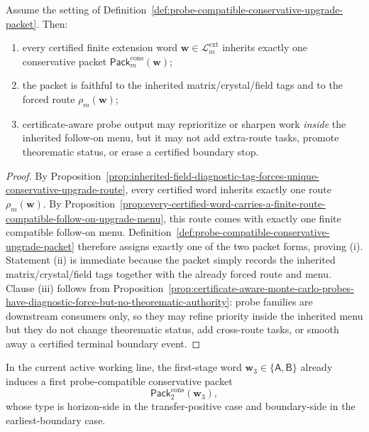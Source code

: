 \begin{proposition}
\label{prop:every-certified-word-inherits-exactly-one-probe-compatible-conservative-upgrade-packet}
Assume the setting of Definition~\ref{def:probe-compatible-conservative-upgrade-packet}. Then:
\begin{enumerate}[label=(\roman*)]
  \item every certified finite extension word \(\mathbf w\in\mathcal L^{\mathrm{ext}}_{m}\) inherits exactly one conservative packet \(\mathsf{Pack}^{\mathrm{cons}}_{m}(\mathbf w)\);
  \item the packet is faithful to the inherited matrix/crystal/field tags and to the forced route \(\rho_m(\mathbf w)\);
  \item certificate-aware probe output may reprioritize or sharpen work \emph{inside} the inherited follow-on menu, but it may not add extra-route tasks, promote theorematic status, or erase a certified boundary stop.
\end{enumerate}
\end{proposition}

\begin{proof}
By Proposition~\ref{prop:inherited-field-diagnostic-tag-forces-unique-conservative-upgrade-route}, every certified word inherits exactly one route \(\rho_m(\mathbf w)\). By Proposition~\ref{prop:every-certified-word-carries-a-finite-route-compatible-follow-on-upgrade-menu}, this route comes with exactly one finite compatible follow-on menu. Definition~\ref{def:probe-compatible-conservative-upgrade-packet} therefore assigns exactly one of the two packet forms, proving (i). Statement (ii) is immediate because the packet simply records the inherited matrix/crystal/field tags together with the already forced route and menu. Clause (iii) follows from Proposition~\ref{prop:certificate-aware-monte-carlo-probes-have-diagnostic-force-but-no-theorematic-authority}: probe families are downstream consumers only, so they may refine priority inside the inherited menu but they do not change theorematic status, add cross-route tasks, or smooth away a certified terminal boundary event.
\end{proof}

\begin{corollary}
\label{cor:present-sigma3-package-already-carries-a-first-conservative-upgrade-packet}
In the current active working line, the first-stage word \(\mathbf w_3\in\{\mathsf A,\mathsf B\}\) already induces a first probe-compatible conservative packet
\[
  \mathsf{Pack}^{\mathrm{cons}}_{2}(\mathbf w_3),
\]
whose type is horizon-side in the transfer-positive case and boundary-side in the earliest-boundary case.
\end{corollary}

